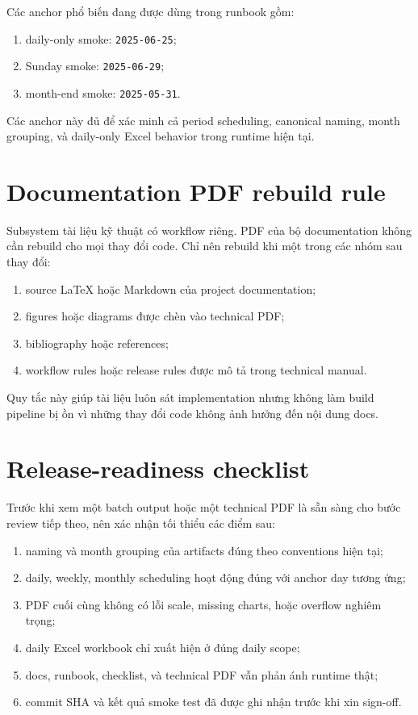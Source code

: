 Các anchor phổ biến đang được dùng trong runbook gồm:

\begin{enumerate}[label=-]
\item daily-only smoke: \texttt{2025-06-25};
\item Sunday smoke: \texttt{2025-06-29};
\item month-end smoke: \texttt{2025-05-31}.
\end{enumerate}

Các anchor này đủ để xác minh cả period scheduling, canonical naming, month grouping, và daily-only Excel behavior trong runtime hiện tại.

\section{Documentation PDF rebuild rule}

Subsystem tài liệu kỹ thuật có workflow riêng. PDF của bộ documentation không cần rebuild cho mọi thay đổi code. Chỉ nên rebuild khi một trong các nhóm sau thay đổi:

\begin{enumerate}[label=-]
\item source LaTeX hoặc Markdown của project documentation;
\item figures hoặc diagrams được chèn vào technical PDF;
\item bibliography hoặc references;
\item workflow rules hoặc release rules được mô tả trong technical manual.
\end{enumerate}

Quy tắc này giúp tài liệu luôn sát implementation nhưng không làm build pipeline bị ồn vì những thay đổi code không ảnh hưởng đến nội dung docs.

\section{Release-readiness checklist}

Trước khi xem một batch output hoặc một technical PDF là sẵn sàng cho bước review tiếp theo, nên xác nhận tối thiểu các điểm sau:

\begin{enumerate}[label=-]
\item naming và month grouping của artifacts đúng theo conventions hiện tại;
\item daily, weekly, monthly scheduling hoạt động đúng với anchor day tương ứng;
\item PDF cuối cùng không có lỗi scale, missing charts, hoặc overflow nghiêm trọng;
\item daily Excel workbook chỉ xuất hiện ở đúng daily scope;
\item docs, runbook, checklist, và technical PDF vẫn phản ánh runtime thật;
\item commit SHA và kết quả smoke test đã được ghi nhận trước khi xin sign-off.
\end{enumerate}

